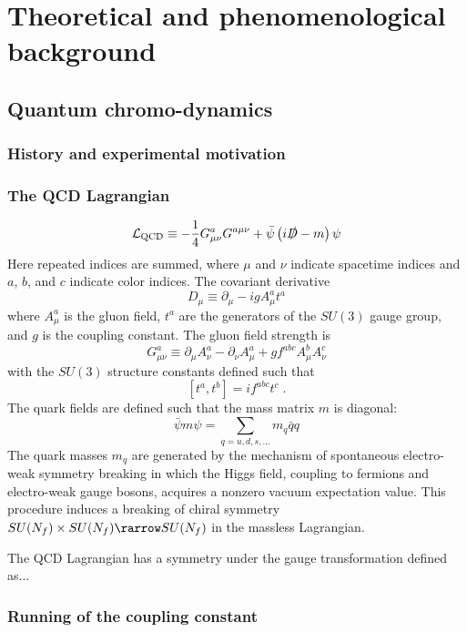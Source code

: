 \chapter{Theoretical and phenomenological background}
\label{ch:background}

\section{Quantum chromo-dynamics}
\subsection{History and experimental motivation}
\subsection{The QCD Lagrangian}
\begin{equation}
  \mathcal{L}_\mathrm{QCD} \equiv -\frac{1}{4} G^a_{\mu\nu}G^{a\mu\nu} + \bar{\psi} \left( i \slashed{D} - m \right) \psi
\end{equation}
Here repeated indices are summed, where $\mu$ and $\nu$ indicate spacetime indices and $a$, $b$, and $c$ indicate color indices.
The covariant derivative
\[ D_\mu \equiv \partial_\mu - i g A^a_\mu t^a\]
where $A^a_\mu$ is the gluon field, $t^a$ are the generators of the $SU(3)$ gauge group, and $g$ is the coupling constant.
The gluon field strength is
\[ G^a_{\mu\nu} \equiv \partial_\mu A^a_\nu - \partial_\nu A^a_\mu + g f^{abc} A^b_\mu A^c_\nu \]
with the $SU(3)$ structure constants defined such that
\[ [t^a,t^b] = if^{abc}t^c \; .\]
The quark fields are defined such that the mass matrix $m$ is diagonal:
\[ \bar{\psi}m\psi = \sum_{q = u,d,s,\ldots} m_{q}\bar{q}q \]
The quark masses $m_q$ are generated by the mechanism of spontaneous electro-weak symmetry breaking in which the Higgs field, coupling to fermions and electro-weak gauge bosons, acquires a nonzero vacuum expectation value.
This procedure induces a breaking of chiral symmetry $SU(N_f) \times SU(N_f) \rarrow SU(N_f)$ in the massless Lagrangian. %

The QCD Lagrangian has a symmetry under the gauge transformation defined as...

\subsection{Running of the coupling constant} %
